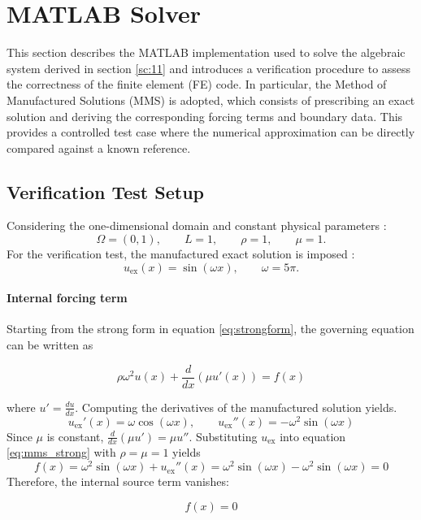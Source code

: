 
\section{MATLAB Solver}
\label{sc:12}

This section describes the MATLAB implementation used to solve the algebraic system derived in section \ref{sc:11} and introduces a verification procedure to assess the correctness of the finite element (FE) code. In particular, the Method of Manufactured Solutions (MMS) is adopted, which consists of prescribing an exact solution and deriving the corresponding forcing terms and boundary data. This provides a controlled test case where the numerical approximation can be directly compared against a known reference.

\subsection{Verification Test Setup}

Considering the one-dimensional domain and constant physical parameters :
\[
\Omega = (0,1),
\qquad L = 1,
\qquad \rho = 1,
\qquad \mu = 1 .
\]
For the verification test, the manufactured exact solution is imposed :
\[
u_{\mathrm{ex}}(x) = \sin(\omega x),
\qquad \omega = 5\pi .
\]

\paragraph{Internal forcing term} Starting from the strong form in equation \eqref{eq:strongform}, the governing equation can be written as

\begin{equation}
\rho \omega^{2} u(x) + \frac{d}{dx}\left(\mu u'(x)\right) = f(x)
\label{eq:mms_strong}
\end{equation}

where \(u' = \frac{du}{dx}\). Computing the derivatives of the manufactured solution yields.
\[
u_{\mathrm{ex}}'(x) = \omega \cos(\omega x),
\qquad
u_{\mathrm{ex}}''(x) = -\omega^{2}\sin(\omega x)
\]
Since \(\mu\) is constant, \(\frac{d}{dx}(\mu u') = \mu u''\). Substituting \(u_{\mathrm{ex}}\) into equation \eqref{eq:mms_strong} with \(\rho=\mu=1\) yields
\[
f(x) = \omega^{2}\sin(\omega x) + u_{\mathrm{ex}}''(x)
      = \omega^{2}\sin(\omega x) - \omega^{2}\sin(\omega x) = 0
\]
Therefore, the internal source term vanishes:

\begin{equation}
    f(x) = 0
    \label{eq:ist}
\end{equation}

